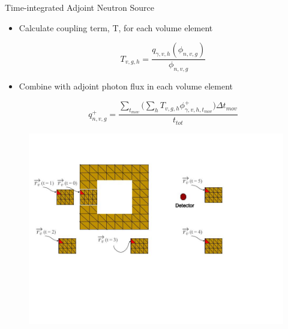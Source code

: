 \documentclass{beamer}
\begin{document}
\begin{frame}{Time-integrated Adjoint Neutron Source}
	\begin{itemize}
          \item{Calculate coupling term, T, for each volume element}

	    \begin{equation}\label{eq:T}
	  	T_{v,g,h} = \dfrac{q_{\gamma,v,h}(\phi_{n,v,g})}{\phi_{n,v,g}}
	    \end{equation}

	  \item{Combine with adjoint photon flux in each volume element}

	    \begin{equation}\label{eq:tgt_n_src}
	    	q_{n,v,g}^{+} = \frac
	    	{\sum_{t_{mov}}\big(\sum_{h} T_{v,g,h}
	    	\phi_{\gamma,v,h,t_{mov}}^{+}\big) \Delta t_{mov}}
	    	{t_{tot}}
	    \end{equation}
	\end{itemize}
        \begin{figure}
	\centering
		\hspace{1.6cm}
		\vspace{1.8cm}
	\includegraphics[scale=0.260]{mesh_total.jpg}
	\end{figure}

\end{frame}
\end{document}
